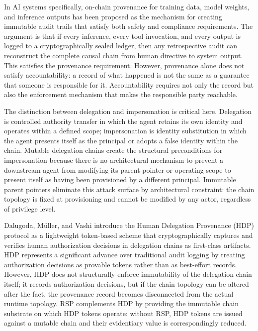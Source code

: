 In AI systems specifically, on-chain provenance for training data, model weights, and inference outputs has been proposed as the mechanism for creating immutable audit trails that satisfy both safety and compliance requirements.\cite{on_chain_provenance_ai} The argument is that if every inference, every tool invocation, and every output is logged to a cryptographically sealed ledger, then any retrospective audit can reconstruct the complete causal chain from human directive to system output. This satisfies the provenance requirement. However, provenance alone does not satisfy accountability: a record of what happened is not the same as a guarantee that someone is responsible for it. Accountability requires not only the record but also the enforcement mechanism that makes the responsible party reachable.\cite{trust_gap_provenance}

The distinction between delegation and impersonation is critical here. Delegation is controlled authority transfer in which the agent retains its own identity and operates within a defined scope; impersonation is identity substitution in which the agent presents itself as the principal or adopts a false identity within the chain.\cite{agent_delegation_vs_impersonation} Mutable delegation chains create the structural preconditions for impersonation because there is no architectural mechanism to prevent a downstream agent from modifying its parent pointer or operating scope to present itself as having been provisioned by a different principal. Immutable parent pointers eliminate this attack surface by architectural constraint: the chain topology is fixed at provisioning and cannot be modified by any actor, regardless of privilege level.

Dalugoda, Müller, and Vashi introduce the Human Delegation Provenance (HDP) protocol as a lightweight token-based scheme that cryptographically captures and verifies human authorization decisions in delegation chains as first-class artifacts.\cite{hdp_protocol_arxiv} HDP represents a significant advance over traditional audit logging by treating authorization decisions as provable tokens rather than as best-effort records. However, HDP does not structurally enforce immutability of the delegation chain itself; it records authorization decisions, but if the chain topology can be altered after the fact, the provenance record becomes disconnected from the actual runtime topology. RSP complements HDP by providing the immutable chain substrate on which HDP tokens operate: without RSP, HDP tokens are issued against a mutable chain and their evidentiary value is correspondingly reduced.

